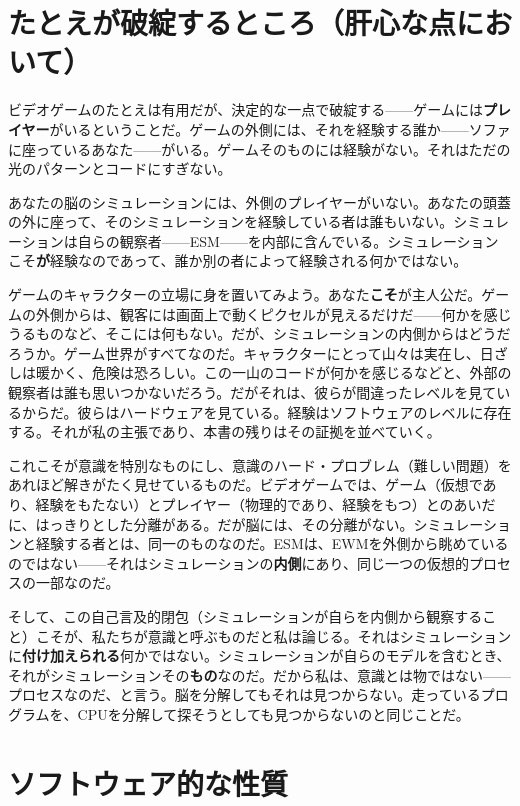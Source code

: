 \documentclass[11pt, twoside, openright]{book}
\begin{document}
\section*{たとえが破綻するところ（肝心な点において）}

ビデオゲームのたとえは有用だが、決定的な一点で破綻する------ゲームには\textbf{プレイヤー}がいるということだ。ゲームの外側には、それを経験する誰か------ソファに座っているあなた------がいる。ゲームそのものには経験がない。それはただの光のパターンとコードにすぎない。

あなたの脳のシミュレーションには、外側のプレイヤーがいない。あなたの頭蓋の外に座って、そのシミュレーションを経験している者は誰もいない。シミュレーションは自らの観察者------ESM------を内部に含んでいる。シミュレーションこそ\textbf{が}経験なのであって、誰か別の者によって経験される何かではない。

ゲームのキャラクターの立場に身を置いてみよう。あなた\textbf{こそ}が主人公だ。ゲームの外側からは、観客には画面上で動くピクセルが見えるだけだ------何かを感じうるものなど、そこには何もない。だが、シミュレーションの内側からはどうだろうか。ゲーム世界がすべてなのだ。キャラクターにとって山々は実在し、日ざしは暖かく、危険は恐ろしい。この一山のコードが何かを感じるなどと、外部の観察者は誰も思いつかないだろう。だがそれは、彼らが間違ったレベルを見ているからだ。彼らはハードウェアを見ている。経験はソフトウェアのレベルに存在する。それが私の主張であり、本書の残りはその証拠を並べていく。

これこそが意識を特別なものにし、意識のハード・プロブレム（難しい問題）をあれほど解きがたく見せているものだ。ビデオゲームでは、ゲーム（仮想であり、経験をもたない）とプレイヤー（物理的であり、経験をもつ）とのあいだに、はっきりとした分離がある。だが脳には、その分離がない。シミュレーションと経験する者とは、同一のものなのだ。ESMは、EWMを外側から眺めているのではない------それはシミュレーションの\textbf{内側}にあり、同じ一つの仮想的プロセスの一部なのだ。

そして、この自己言及的閉包（シミュレーションが自らを内側から観察すること）こそが、私たちが意識と呼ぶものだと私は論じる。それはシミュレーションに\textbf{付け加えられる}何かではない。シミュレーションが自らのモデルを含むとき、それがシミュレーションその\textbf{もの}なのだ。だから私は、意識とは物ではない------プロセスなのだ、と言う。脳を分解してもそれは見つからない。走っているプログラムを、CPUを分解して探そうとしても見つからないのと同じことだ。

\section*{ソフトウェア的な性質}
\end{document}
